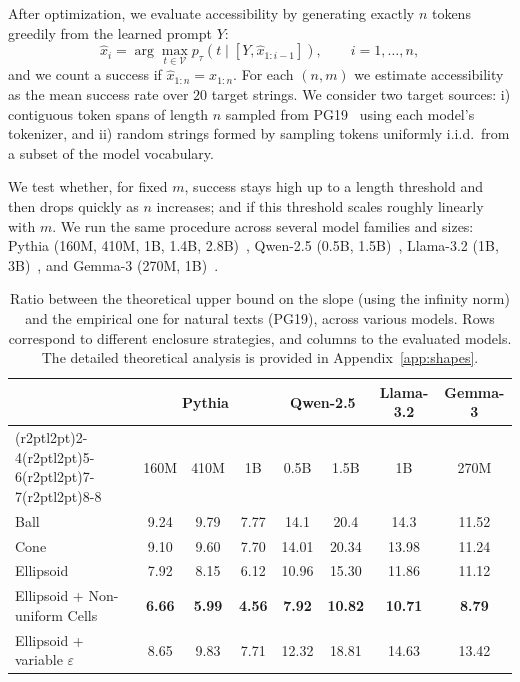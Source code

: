 After optimization, we evaluate accessibility by generating exactly $n$ tokens greedily from the learned prompt $Y$:
\begin{equation}
\hat{x}_i = \arg\max_{t \in \mathcal{V}} p_{\tau}\!\left(t \mid [Y, \hat{x}_{1:i-1}]\right),
\qquad i=1,\dots,n,
\label{eq:greedy_decode}
\end{equation}
and we count a success if $\hat{x}_{1:n}=x_{1:n}$. For each $(n,m)$ we estimate accessibility as the mean success rate over $20$ target strings.
We consider two target sources: i) contiguous token spans of length $n$ sampled from PG19~\citep{rae2019compressive} using each model's tokenizer, and ii) random strings formed by sampling tokens uniformly i.i.d.\ from a subset of the model vocabulary. 

We test whether, for fixed $m$, success stays high up to a length threshold and then drops quickly as $n$ increases; and if this threshold scales roughly linearly with $m$. 
We run the same procedure across several model families and sizes: Pythia (160M, 410M, 1B, 1.4B, 2.8B)~\citep{pmlr-v202-biderman23a}, Qwen-2.5 (0.5B, 1.5B)~\citep{yang2024qwen2}, Llama-3.2 (1B, 3B)~\citep{llama}, and Gemma-3 (270M, 1B)~\citep{gemma}.


\begin{table}[ht]
\centering
\caption{Ratio between the theoretical upper bound on the slope (using the infinity norm) and the empirical one for natural texts (PG19), across various models. Rows correspond to different enclosure strategies, and columns to the evaluated models. The detailed theoretical analysis is provided in Appendix~\ref{app:shapes}.}
\begin{tabular}{lccccccc}
\toprule
 & \multicolumn{3}{c}{Pythia} & \multicolumn{2}{c}{Qwen-2.5} & Llama-3.2 & Gemma-3 \\[-0.5ex]
\cmidrule(r{2pt}l{2pt}){2-4}\cmidrule(r{2pt}l{2pt}){5-6}\cmidrule(r{2pt}l{2pt}){7-7}\cmidrule(r{2pt}l{2pt}){8-8}
 & 160M & 410M & 1B & 0.5B & 1.5B & 1B & 270M \\[-0.5ex]
\midrule
Ball & 9.24 & 9.79 & 7.77 & 14.1 & 20.4 & 14.3 & 11.52 \\
Cone & 9.10&  9.60&  7.70&  14.01& 20.34& 13.98& 11.24 \\ 
Ellipsoid & 7.92&  8.15&  6.12&  10.96& 15.30& 11.86& 11.12 \\
Ellipsoid + Non-uniform Cells & \textbf{6.66} & \textbf{5.99} & \textbf{4.56} & \textbf{7.92} & \textbf{10.82} & \textbf{10.71} & \textbf{8.79} \\ 
Ellipsoid + variable $\varepsilon$& 8.65 & 9.83 & 7.71 & 12.32 & 18.81 & 14.63 & 13.42 \\ 


\bottomrule
\end{tabular}
\label{tbl:slope}
\end{table}


